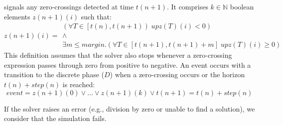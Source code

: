 \documentclass[11pt,titlepage,twoside]{report}
\newcommand{\bN}{\mathbb{N}}
\begin{document}
\begin{description}[leftmargin=3.5em,style=multiline]
    \item[$z(n+1)$] signals any zero-crossings detected at time $t(n+1)$.
      It comprises $k \in \bN$ boolean elements $z(n+1)(i)$ such that:
      \[
      z(n+1)(i) = %
        \begin{array}{l}
           (\forall T \in \left[t(n), t(n+1)\right) \; upz(T)(i) < 0) \\
           \wedge \\
           \exists m \leq \mathit{margin}.
              (\forall T \in [t(n+1), t(n+1)+m] \; upz(T)(i) \geq 0)
        \end{array}
      \]
This definition assumes that the solver also stops whenever a zero-crossing 
expression passes through zero from positive to negative.
An event occurs with a transition to the discrete phase ($D$) when a zero-crossing
occurs or the horizon $t(n)+step(n)$ is reached:
  \[\mathit{event} = z(n+1)(0) \vee \dots \vee z(n+1)(k) \vee
                             t(n+1) = t(n) + step(n)
  \]
\end{description}
If the solver raises an error (e.g., division by zero or unable to find a
solution), we consider that the simulation fails.
\end{document}
